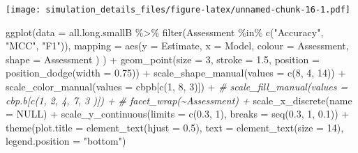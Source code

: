 \documentclass[
]{article}
\newenvironment{Shaded}{\begin{snugshade}}{\end{snugshade}}
\newcommand{\AttributeTok}[1]{\textcolor[rgb]{0.77,0.63,0.00}{#1}}
\newcommand{\CommentTok}[1]{\textcolor[rgb]{0.56,0.35,0.01}{\textit{#1}}}
\newcommand{\ConstantTok}[1]{\textcolor[rgb]{0.00,0.00,0.00}{#1}}
\newcommand{\DecValTok}[1]{\textcolor[rgb]{0.00,0.00,0.81}{#1}}
\newcommand{\FloatTok}[1]{\textcolor[rgb]{0.00,0.00,0.81}{#1}}
\newcommand{\FunctionTok}[1]{\textcolor[rgb]{0.00,0.00,0.00}{#1}}
\newcommand{\NormalTok}[1]{#1}
\newcommand{\SpecialCharTok}[1]{\textcolor[rgb]{0.00,0.00,0.00}{#1}}
\newcommand{\StringTok}[1]{\textcolor[rgb]{0.31,0.60,0.02}{#1}}
\begin{document}
\texttt{[image: simulation\_details\_files/figure-latex/unnamed-chunk-16-1.pdf]}

\begin{Shaded}
\begin{Highlighting}[]
\FunctionTok{ggplot}\NormalTok{(}\AttributeTok{data =}\NormalTok{ all.long.smallB }\SpecialCharTok{\%\textgreater{}\%} 
         \FunctionTok{filter}\NormalTok{(Assessment }\SpecialCharTok{\%in\%} \FunctionTok{c}\NormalTok{(}\StringTok{"Accuracy"}\NormalTok{, }\StringTok{"MCC"}\NormalTok{, }\StringTok{"F1"}\NormalTok{)),}
       \AttributeTok{mapping =} \FunctionTok{aes}\NormalTok{(}\AttributeTok{y =}\NormalTok{ Estimate,}
                     \AttributeTok{x =}\NormalTok{ Model, }
                     \AttributeTok{colour =}\NormalTok{ Assessment,}
                     \AttributeTok{shape =}\NormalTok{ Assessment}
\NormalTok{                     )}
\NormalTok{       ) }\SpecialCharTok{+}
  \FunctionTok{geom\_point}\NormalTok{(}\AttributeTok{size =} \DecValTok{3}\NormalTok{, }\AttributeTok{stroke =} \FloatTok{1.5}\NormalTok{,}
             \AttributeTok{position =} \FunctionTok{position\_dodge}\NormalTok{(}\AttributeTok{width =} \FloatTok{0.75}\NormalTok{)) }\SpecialCharTok{+}
  \FunctionTok{scale\_shape\_manual}\NormalTok{(}\AttributeTok{values =} \FunctionTok{c}\NormalTok{(}\DecValTok{8}\NormalTok{, }\DecValTok{4}\NormalTok{, }\DecValTok{14}\NormalTok{)) }\SpecialCharTok{+}
  \FunctionTok{scale\_color\_manual}\NormalTok{(}\AttributeTok{values =}\NormalTok{ cbpb[}\FunctionTok{c}\NormalTok{(}\DecValTok{1}\NormalTok{, }\DecValTok{8}\NormalTok{, }\DecValTok{3}\NormalTok{)]) }\SpecialCharTok{+}
  \CommentTok{\# scale\_fill\_manual(values = cbp.b[c(1, 2, 4, 7, 3 )]) +}
  \CommentTok{\# facet\_wrap(\textasciitilde{}Assessment) +}
  \FunctionTok{scale\_x\_discrete}\NormalTok{(}\AttributeTok{name =} \ConstantTok{NULL}\NormalTok{) }\SpecialCharTok{+}
  \FunctionTok{scale\_y\_continuous}\NormalTok{(}\AttributeTok{limits =} \FunctionTok{c}\NormalTok{(}\FloatTok{0.3}\NormalTok{, }\DecValTok{1}\NormalTok{),}
                     \AttributeTok{breaks =} \FunctionTok{seq}\NormalTok{(}\FloatTok{0.3}\NormalTok{, }\DecValTok{1}\NormalTok{, }\FloatTok{0.1}\NormalTok{)) }\SpecialCharTok{+}
  \FunctionTok{theme}\NormalTok{(}\AttributeTok{plot.title =} \FunctionTok{element\_text}\NormalTok{(}\AttributeTok{hjust =} \FloatTok{0.5}\NormalTok{), }
        \AttributeTok{text =} \FunctionTok{element\_text}\NormalTok{(}\AttributeTok{size =} \DecValTok{14}\NormalTok{),}
        \AttributeTok{legend.position =} \StringTok{"bottom"}\NormalTok{)}
\end{Highlighting}
\end{Shaded}
\end{document}
